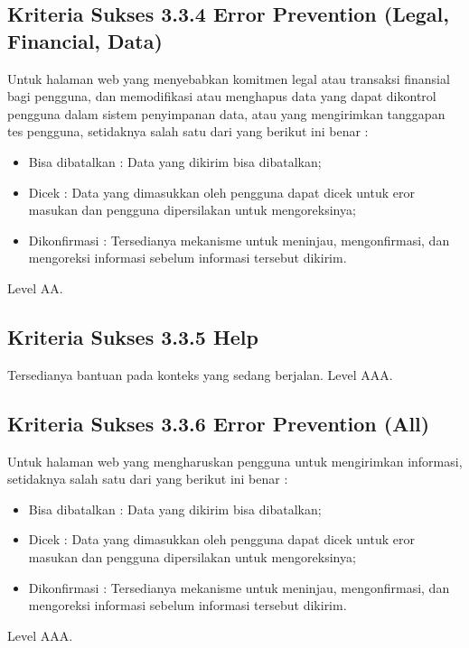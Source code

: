 \subsection{Kriteria Sukses 3.3.4 Error Prevention (Legal, Financial, Data)}
\label{sec:kriteria_3.3.4}
Untuk halaman web yang menyebabkan komitmen legal atau transaksi finansial bagi pengguna, dan memodifikasi atau menghapus data yang dapat dikontrol pengguna dalam sistem penyimpanan data, atau yang mengirimkan tanggapan tes pengguna, setidaknya salah satu dari yang berikut ini benar :

\begin{itemize}
	\item Bisa dibatalkan : Data yang dikirim bisa dibatalkan;
	\item Dicek : Data yang dimasukkan oleh pengguna dapat dicek untuk eror masukan dan pengguna dipersilakan untuk mengoreksinya;
	\item Dikonfirmasi : Tersedianya mekanisme untuk meninjau, mengonfirmasi, dan mengoreksi informasi sebelum informasi tersebut dikirim.
\end{itemize}

Level AA.

\subsection{Kriteria Sukses 3.3.5 Help}
\label{sec:kriteria_3.3.5}
Tersedianya bantuan pada konteks yang sedang berjalan.
Level AAA.

\subsection{Kriteria Sukses 3.3.6 Error Prevention (All)}
\label{sec:kriteria_3.3.6}
Untuk halaman web yang mengharuskan pengguna untuk mengirimkan informasi, setidaknya salah satu dari yang berikut ini benar :

\begin{itemize}
	\item Bisa dibatalkan : Data yang dikirim bisa dibatalkan;
	\item Dicek : Data yang dimasukkan oleh pengguna dapat dicek untuk eror masukan dan pengguna dipersilakan untuk mengoreksinya;
	\item Dikonfirmasi : Tersedianya mekanisme untuk meninjau, mengonfirmasi, dan mengoreksi informasi sebelum informasi tersebut dikirim.
\end{itemize}

Level AAA.

